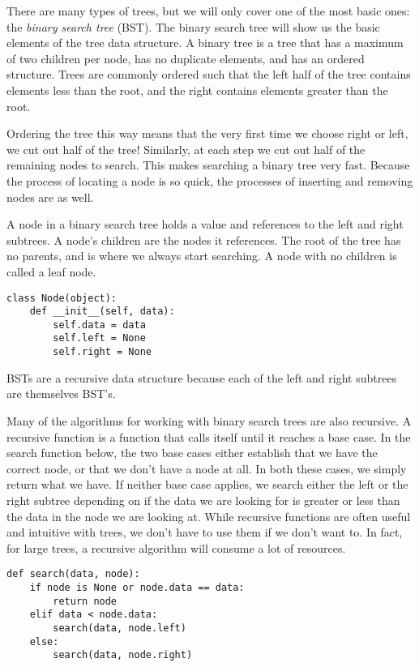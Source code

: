 There are many types of trees, but we will only cover one of the most basic ones: the \emph{binary search tree} (BST).
The binary search tree will show us the basic elements of the tree data structure.
A binary tree is a tree that has a maximum of two children per node,
has no duplicate elements, and has an ordered structure.
Trees are commonly ordered such that the left half of the tree contains elements less than the root, and the right contains elements greater than the root.

Ordering the tree this way means that the very first time we choose right or left, we cut out half of the tree!
Similarly, at each step we cut out half of the remaining nodes to search.
This makes searching a binary tree very fast.
Because the process of locating a node is so quick, the processes of inserting and removing nodes are as well.

A node in a binary search tree holds a value and references to the left and right subtrees.
A node's children are the nodes it references.
The root of the tree has no parents, and is where we always start searching.
A node with no children is called a leaf node.

\begin{lstlisting}
class Node(object):
    def __init__(self, data):
        self.data = data
        self.left = None
        self.right = None
\end{lstlisting}

BSTs are a recursive data structure because each of the left and right subtrees are themselves BST's.

Many of the algorithms for working with binary search trees are also recursive.
A recursive function is a function that calls itself until it reaches a base case.
In the search function below, the two base cases either establish that we have the correct
node, or that we don't have a node at all.
In both these cases, we simply return what we have.
If neither base case applies, we search either the left or the right subtree depending on if the data we are looking for is greater or less than the data in the node we are looking at.
While recursive functions are often useful and intuitive with trees, we don't have to use them if we don't want to.
In fact, for large trees, a recursive algorithm will consume a lot of resources.

\begin{lstlisting}
def search(data, node):
    if node is None or node.data == data:
        return node
    elif data < node.data:
        search(data, node.left)
    else:
        search(data, node.right)
\end{lstlisting}


